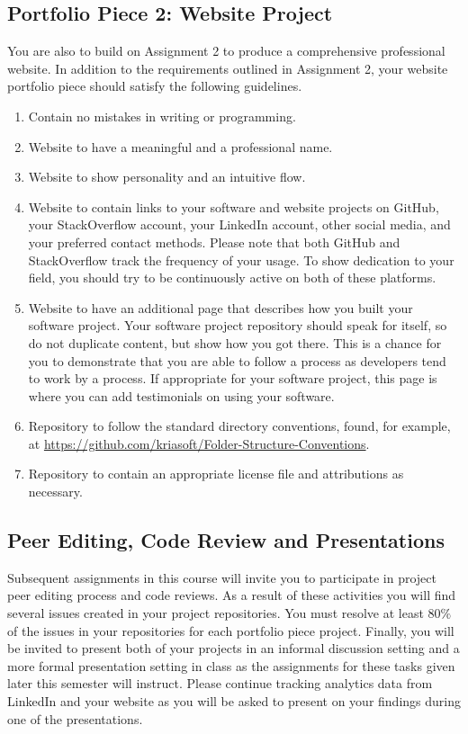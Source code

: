 \documentclass[11pt]{article}
\begin{document}
\subsection*{Portfolio Piece 2: Website Project}
You are also to build on Assignment 2 to produce a comprehensive professional website. In addition to the requirements outlined in Assignment 2, your website portfolio piece should satisfy the following guidelines.
\begin{enumerate}
	\item Contain no mistakes in writing or programming. 
	\item Website to have a meaningful and a professional name.
	\item Website to show personality and an intuitive flow.
	\item Website to contain links to your software and website projects on GitHub, your StackOverflow account, your LinkedIn account, other social media, and your preferred contact methods. Please note that both GitHub and StackOverflow track the frequency of your usage. To show dedication to your field, you should try to be continuously active on both of these platforms.
	\item Website to have an additional page that describes how you built your software project. Your software project repository should speak for itself, so do not duplicate content, but show how you got there. This is a chance for you to demonstrate that you are able to follow a process as developers tend to work by a process. If appropriate for your software project, this page is where you can add testimonials on using your software. 
	\item Repository to follow the standard directory conventions, found, for example, at \url{https://github.com/kriasoft/Folder-Structure-Conventions}.
	\item Repository to contain an appropriate license file and attributions as necessary.
\end{enumerate}

\subsection*{Peer Editing, Code Review and Presentations}
Subsequent assignments in this course will invite you to participate in project peer editing process and code reviews. As a result of these activities you will find several issues created in your project repositories. You must resolve at least $80\%$ of the issues in your repositories for each portfolio piece project. Finally, you will be invited to present both of your projects in an informal discussion setting and a more formal presentation setting in class as the assignments for these tasks given later this semester will instruct. Please continue tracking analytics data from LinkedIn and your website as you will be asked to present on your findings during one of the presentations.
\end{document}

